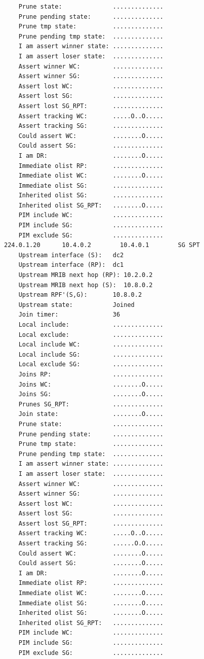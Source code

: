 \documentclass[11pt]{report}
\begin{document}
\begin{itemize}
\begin{verbatim}
    Prune state:              ..............
    Prune pending state:      ..............
    Prune tmp state:          ..............
    Prune pending tmp state:  ..............
    I am assert winner state: ..............
    I am assert loser state:  ..............
    Assert winner WC:         ..............
    Assert winner SG:         ..............
    Assert lost WC:           ..............
    Assert lost SG:           ..............
    Assert lost SG_RPT:       ..............
    Assert tracking WC:       .....O..O.....
    Assert tracking SG:       ..............
    Could assert WC:          ........O.....
    Could assert SG:          ..............
    I am DR:                  ........O.....
    Immediate olist RP:       ..............
    Immediate olist WC:       ........O.....
    Immediate olist SG:       ..............
    Inherited olist SG:       ..............
    Inherited olist SG_RPT:   ........O.....
    PIM include WC:           ..............
    PIM include SG:           ..............
    PIM exclude SG:           ..............
224.0.1.20      10.4.0.2        10.4.0.1        SG SPT 
    Upstream interface (S):   dc2
    Upstream interface (RP):  dc1
    Upstream MRIB next hop (RP): 10.2.0.2
    Upstream MRIB next hop (S):  10.8.0.2
    Upstream RPF'(S,G):       10.8.0.2
    Upstream state:           Joined 
    Join timer:               36
    Local include:            ..............
    Local exclude:            ..............
    Local include WC:         ..............
    Local include SG:         ..............
    Local exclude SG:         ..............
    Joins RP:                 ..............
    Joins WC:                 ........O.....
    Joins SG:                 ........O.....
    Prunes SG_RPT:            ..............
    Join state:               ........O.....
    Prune state:              ..............
    Prune pending state:      ..............
    Prune tmp state:          ..............
    Prune pending tmp state:  ..............
    I am assert winner state: ..............
    I am assert loser state:  ..............
    Assert winner WC:         ..............
    Assert winner SG:         ..............
    Assert lost WC:           ..............
    Assert lost SG:           ..............
    Assert lost SG_RPT:       ..............
    Assert tracking WC:       .....O..O.....
    Assert tracking SG:       ......O.O.....
    Could assert WC:          ........O.....
    Could assert SG:          ........O.....
    I am DR:                  ........O.....
    Immediate olist RP:       ..............
    Immediate olist WC:       ........O.....
    Immediate olist SG:       ........O.....
    Inherited olist SG:       ........O.....
    Inherited olist SG_RPT:   ..............
    PIM include WC:           ..............
    PIM include SG:           ..............
    PIM exclude SG:           ..............
\end{verbatim}


\end{itemize}
\end{document}
